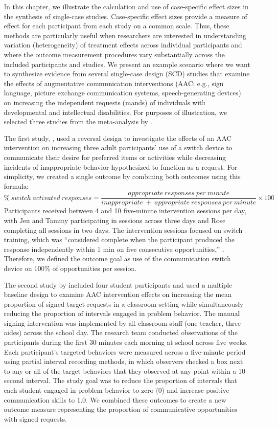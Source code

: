 \documentclass[
]{book}
\begin{document}
In this chapter, we illustrate the calculation and use of case-specific effect sizes in the synthesis of single-case studies. Case-specific effect sizes provide a measure of effect for each participant from each study on a common scale. Thus, these methods are particularly useful when researchers are interested in understanding variation (heterogeneity) of treatment effects across individual participants and where the outcome measurement procedures vary substantially across the included participants and studies. We present an example scenario where we want to synthesize evidence from several single-case design (SCD) studies that examine the effects of augmentative communication interventions (AAC; e.g., sign language, picture exchange communication systems, speech-generating devices) on increasing the independent requests (mands) of individuals with developmental and intellectual disabilities. For purposes of illustration, we selected three studies from the meta-analysis by \citep{Ganz_et_al_2023}.

The first study, \citet{Byiers2014}, used a reversal design to investigate the effects of an AAC intervention on increasing three adult participants' use of a switch device to communicate their desire for preferred items or activities while decreasing incidents of inappropriate behavior hypothesized to function as a request. For simplicity, we created a single outcome by combining both outcomes using this formula:
\[
\% \ switch \ activated \ responses = \frac{appropriate \ responses \ per \ minute}{inappropriate \ + \ appropriate \ responses \ per \ minute}\times 100
\]
Participants received between 4 and 10 five-minute intervention sessions per day, with Jen and Tammy participating in sessions across three days and Rose completing all sessions in two days. The intervention sessions focused on switch training, which was ``considered complete when the participant produced the response independently within 1 min on five consecutive opportunities,'' \citep[p.~344]{Byiers2014}. Therefore, we defined the outcome goal as use of the communication switch device on 100\(\%\) of opportunities per session.

The second study by \citet{Casey1978} included four student participants and used a multiple baseline design to examine AAC intervention effects on increasing the mean proportion of signed target requests in a classroom setting while simultaneously reducing the proportion of intervals engaged in problem behavior. The manual signing intervention was implemented by all classroom staff (one teacher, three aides) across the school day. The research team conducted observations of the participants during the first 30 minutes each morning at school across five weeks. Each participant's targeted behaviors were measured across a five-minute period using partial interval recording methods, in which observers checked a box next to any or all of the target behaviors that they observed at any point within a 10-second interval. The study goal was to reduce the proportion of intervals that each student engaged in problem behavior to zero (0) and increase positive communication skills to 1.0. We combined these outcomes to create a new outcome measure representing the proportion of communicative opportunities with signed requests.
\end{document}
